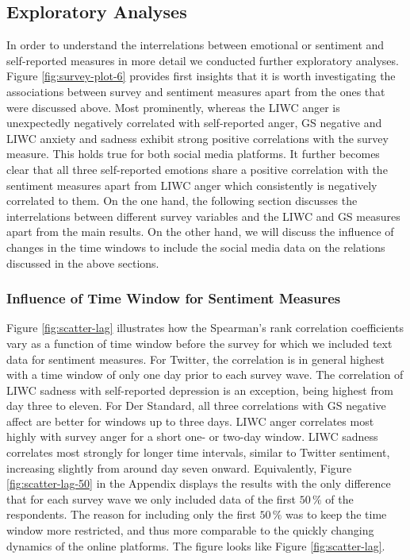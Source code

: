 \documentclass[
  english,
  jou,floatsintext]{apa7}
\begin{document}
\hypertarget{exploratory-analyses-1}{%
\subsection{Exploratory Analyses}\label{exploratory-analyses-1}}

In order to understand the interrelations between emotional or sentiment and self-reported measures in more detail we conducted further exploratory analyses. Figure \ref{fig:survey-plot-6} provides first insights that it is worth investigating the associations between survey and sentiment measures apart from the ones that were discussed above. Most prominently, whereas the LIWC anger is unexpectedly negatively correlated with self-reported anger, GS negative and LIWC anxiety and sadness exhibit strong positive correlations with the survey measure. This holds true for both social media platforms. It further becomes clear that all three self-reported emotions share a positive correlation with the sentiment measures apart from LIWC anger which consistently is negatively correlated to them. On the one hand, the following section discusses the interrelations between different survey variables and the LIWC and GS measures apart from the main results. On the other hand, we will discuss the influence of changes in the time windows to include the social media data on the relations discussed in the above sections.

\hypertarget{influence-of-time-window-for-sentiment-measures}{%
\subsubsection{Influence of Time Window for Sentiment Measures}\label{influence-of-time-window-for-sentiment-measures}}

Figure \ref{fig:scatter-lag} illustrates how the Spearman's rank correlation coefficients vary as a function of time window before the survey for which we included text data for sentiment measures.
For Twitter, the correlation is in general highest with a time window of only one day prior to each survey wave. The correlation of LIWC sadness with self-reported depression is an exception, being highest from day three to eleven. For Der Standard, all three correlations with GS negative affect are better for windows up to three days. LIWC anger correlates most highly with survey anger for a short one- or two-day window. LIWC sadness correlates most strongly for longer time intervals, similar to Twitter sentiment, increasing slightly from around day seven onward.
Equivalently, Figure \ref{fig:scatter-lag-50} in the Appendix displays the results with the only difference that for each survey wave we only included data of the first \(50\,\%\) of the respondents. The reason for including only the first \(50\,\%\) was to keep the time window more restricted, and thus more comparable to the quickly changing dynamics of the online platforms. The figure looks like Figure \ref{fig:scatter-lag}.
\end{document}
